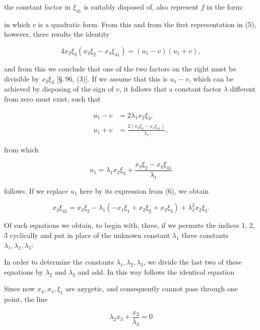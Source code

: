 the constant factor in $\xi_{41}$ is suitably disposed of, also represent $f$ in the form:


in which $v$ is a quadratic form. From this and from the first representation in (5), however, there results the identity

\[
4x_2\xi_3(x_3\xi_2 - x_4\xi_{41}) = (u_1 - v)(u_1 + v),
\]

and from this we conclude that one of the two factors on the right must be divisible by $x_2\xi_3$ [\S.\,96, (3)]. If we assume that this is $u_1 - v$, which can be achieved by disposing of the sign of $v$, it follows that a constant factor $\lambda$ different from zero must exist, such that

\[
\begin{aligned}
u_1 - v &= 2\lambda_1 x_2\xi_3,\\
u_1 + v &= \frac{2(x_3\xi_2 - x_4\xi_{41})}{\lambda_1},
\end{aligned}
\]

from which

\[
u_1 = \lambda_1 x_2\xi_3 + \frac{x_3\xi_2 - x_4\xi_{41}}{\lambda_1}
\]

follows. If we replace $u_1$ here by its expression from (6), we obtain

\[
x_4\xi_{41} = x_3\xi_2 - \lambda_1(-x_1\xi_1 + x_2\xi_2 + x_3\xi_3) + \lambda_1^2 x_2\xi_3.
\]

Of such equations we obtain, to begin with, three, if we permute the indices 1, 2, 3 cyclically and put in place of the unknown constant $\lambda_1$ three constants $\lambda_1, \lambda_2, \lambda_3$:


In order to determine the constants $\lambda_1, \lambda_2, \lambda_3$, we divide the last two of these equations by $\lambda_2$ and $\lambda_3$ and add. In this way follows the identical equation


Since now $x_4, x_1, \xi_1$ are azygetic, and consequently cannot pass through one point, the line

\[
\lambda_2 x_3 + \frac{x_2}{\lambda_3} = 0
\]
